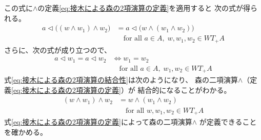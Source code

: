 		この式に$\land$の定義\eqref{eq:接木による森の2項演算の定義}を適用すると
		次の式が得られる。
		\begin{equation}\label{eq:接木による森の2項演算の結合性}\begin{split} %
			a\lhd \bigl((w\land w_1)\land w_2\bigr)
			&= a\lhd \bigl(w\land(w_1\land w_2)\bigr) \\
			&\quad\text{for all }a\in A,\;w,w_1,w_2\in WT_+A
		\end{split}\end{equation} %
		さらに、次の式が成り立つので、
		\begin{equation}\begin{split} %
			a\lhd w_1 = a\lhd w_2 &\iff w_1=w_2 \\
			&\quad\text{for all }a\in A,\;w_1,w_2\in WT_+A
		\end{split}\end{equation} %
		式\eqref{eq:接木による森の2項演算の結合性}は次のようになり、
		森の二項演算$\land$（定義\eqref{eq:接木による森の2項演算の定義}）が
		結合的になることがわかる。
		\begin{equation*}\begin{split} %
			(w\land w_1)\land w_2 &= w\land(w_1\land w_2) \\
			&\quad\text{for all }w,w_1,w_2\in WT_+A
		\end{split}\end{equation*} %
		式\eqref{eq:接木による森の2項演算の定義}によって森の二項演算$\land$
		が定義できることを確かめる。
